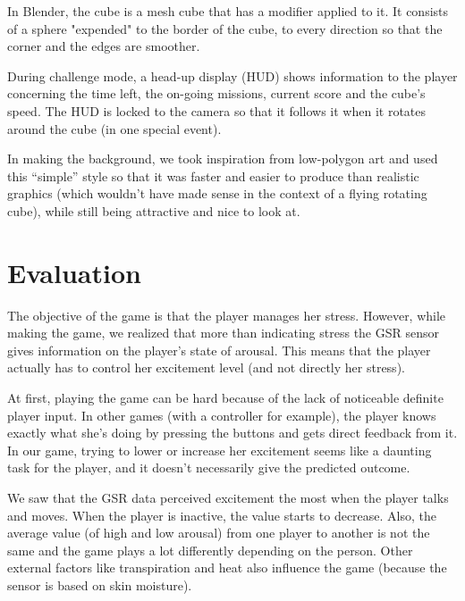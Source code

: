 \documentclass[12pt,a4paper]{article}
\begin{document}
In Blender, the cube is a mesh cube that has a modifier applied to it. It consists of a sphere "expended" to the border of the cube, to every direction so that the corner and the edges are smoother.


During challenge mode, a head-up display (HUD) shows information to the player concerning the time left, the on-going missions, current score and the cube's speed. The HUD is locked to the camera so that it follows it when it rotates around the cube (in one special event).

In making the background, we took inspiration from low-polygon art and used this ``simple'' style so that it was faster and easier to produce than realistic graphics (which wouldn't have made sense in the context of a flying rotating cube), while still being attractive and nice to look at.


\section{Evaluation}


The objective of the game is that the player manages her stress. However, while making the game, we realized that more than indicating stress the GSR sensor gives information on the player's state of arousal. This means that the player actually has to control her excitement level (and not directly her stress).

At first, playing the game can be hard because of the lack of noticeable definite player input. In other games (with a controller for example), the player knows exactly what she's doing by pressing the buttons and gets direct feedback from it. In our game, trying to lower or increase her excitement seems like a daunting task for the player, and it doesn't necessarily give the predicted outcome. 

We saw that the GSR data perceived excitement the most when the player talks and moves. When the player is inactive, the value starts to decrease. Also, the average value (of high and low arousal) from one player to another is not the same and the game plays a lot differently depending on the person. Other external factors like transpiration and heat also influence the game (because the sensor is based on skin moisture).
\end{document}
